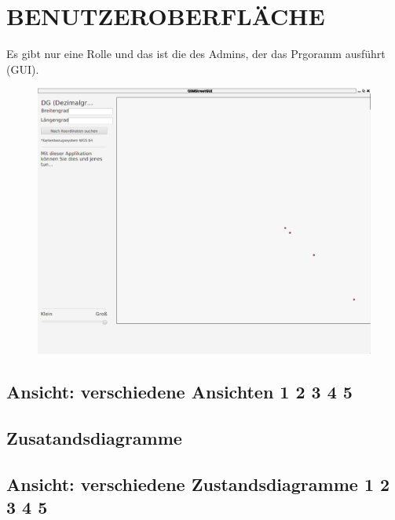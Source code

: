	\section{\Large BENUTZEROBERFLÄCHE}
	Es gibt nur eine Rolle und das ist die des Admins, der das Prgoramm ausführt (GUI).
	\begin{figure}
	\centering
	\includegraphics[width=0.7\linewidth]{images/GUI}
	\caption{}
	\label{fig:GUI}
	\end{figure}
	\subsection{Ansicht: verschiedene Ansichten 1 2 3 4 5}
	\subsection{Zusatandsdiagramme}
	\subsection{Ansicht: verschiedene Zustandsdiagramme 1 2 3 4 5}
	
	

